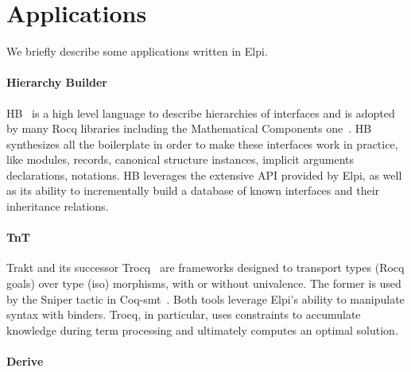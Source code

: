 \documentclass[sigplan,natbib=false]{acmart}
\begin{document}
\section{Applications}

We briefly describe some applications written in Elpi.

\paragraph{Hierarchy Builder}
HB~\cite{cohen_et_al:LIPIcs.FSCD.2020.34} is a high level language to describe hierarchies
of interfaces and is adopted by many Rocq libraries including the Mathematical
Components one~\cite{affeldt:hal-03463762}. HB synthesizes all the boilerplate in order to
make these interfaces work in practice, like modules, records, canonical
structure instances, implicit arguments declarations, notations. 
HB leverages the extensive API provided by Elpi, as well as its ability to incrementally
build a database of known interfaces and their inheritance relations.

\paragraph{TnT}

Trakt and its successor Trocq~\cite{10.1007/978-3-031-57262-3_10} are
frameworks designed to transport types (Rocq goals) over type
(iso) morphisms, with or without univalence. The former is used by the Sniper
tactic in Coq-smt~\cite{DBLP:conf/cpp/Blot0CPKMV23}. Both tools leverage
Elpi's ability to manipulate syntax with binders. Trocq, in particular, uses
constraints to accumulate knowledge during term processing and ultimately
computes an optimal solution.

\paragraph{Derive}
\end{document}
